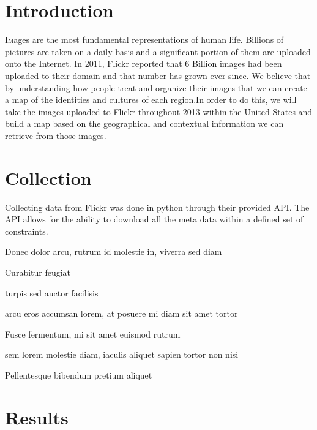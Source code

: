 \documentclass[twoside]{article}
\begin{document}
\begin{multicols}{2} %

\section{Introduction}

\lettrine[nindent=0em,lines=3]{I}mages are the most fundamental representations of human life. Billions of pictures are taken on a daily basis and a significant portion of them are uploaded onto the Internet. In 2011, Flickr reported that 6 Billion images had been uploaded to their domain and that number has grown ever since. We believe that by understanding how people treat and organize their images that we can create a map of the identities and cultures of each region.In order to do this, we will take the images uploaded to Flickr throughout 2013 within the United States and build a map based on the geographical and contextual information we can retrieve from those images.



\section{Collection}

Collecting data from Flickr was done in python through their provided API. The API allows for the ability to download all the meta data within a defined set of constraints.
\begin{compactitem}
\item Donec dolor arcu, rutrum id molestie in, viverra sed diam
\item Curabitur feugiat
\item turpis sed auctor facilisis
\item arcu eros accumsan lorem, at posuere mi diam sit amet tortor
\item Fusce fermentum, mi sit amet euismod rutrum
\item sem lorem molestie diam, iaculis aliquet sapien tortor non nisi
\item Pellentesque bibendum pretium aliquet
\end{compactitem}


\section{Results}


\end{multicols}
\end{document}
